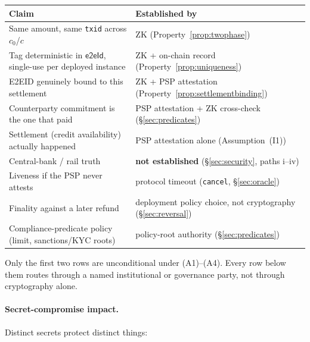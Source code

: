 \documentclass[11pt]{article}
\newcommand{\eeid}{\ensuremath{\mathsf{e2eId}}}
\newcommand{\code}[1]{\texttt{#1}}
\begin{document}
\begin{center}
\small
\begin{tabular}{@{}p{}p{}@{}}
\toprule
\textbf{Claim} & \textbf{Established by} \\
\midrule
Same amount, same \code{txid} across $c_0$/$c$ & ZK (Property~\ref{prop:twophase}) \\
Tag deterministic in \eeid{}, single-use per deployed instance & ZK + on-chain record (Property~\ref{prop:uniqueness}) \\
E2EID genuinely bound to this settlement & ZK + PSP attestation (Property~\ref{prop:settlementbinding}) \\
Counterparty commitment is the one that paid & PSP attestation + ZK cross-check (\S\ref{sec:predicates}) \\
Settlement (credit availability) actually happened & PSP attestation alone (Assumption~(I1)) \\
Central-bank / rail truth & \textbf{not established} (\S\ref{sec:security}, paths i--iv) \\
Liveness if the PSP never attests & protocol timeout (\code{cancel}, \S\ref{sec:oracle}) \\
Finality against a later refund & deployment policy choice, not cryptography (\S\ref{sec:reversal}) \\
Compliance-predicate policy (limit, sanctions/KYC roots) & policy-root authority (\S\ref{sec:predicates}) \\
\bottomrule
\end{tabular}
\end{center}
\noindent Only the first two rows are unconditional under (A1)--(A4). Every
row below them routes through a named institutional or governance party, not
through cryptography alone.

\paragraph{Secret-compromise impact.} Distinct secrets protect distinct
things:
\end{document}
